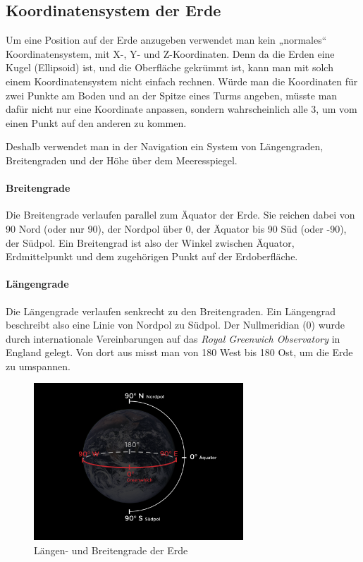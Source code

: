 \documentclass[12pt,a4paper]{scrartcl}
\begin{document}
\subsection{Koordinatensystem der Erde}
Um eine Position auf der Erde anzugeben verwendet man kein „normales“ Koordinatensystem, mit X-, Y- und Z-Koordinaten. Denn da die Erden eine Kugel (Ellipsoid) ist, und die Oberfläche gekrümmt ist, kann man mit solch einem Koordinatensystem nicht einfach rechnen. Würde man die Koordinaten für zwei Punkte am Boden und an der Spitze eines Turms angeben, müsste man dafür nicht nur eine Koordinate anpassen, sondern wahrscheinlich alle 3, um vom einen Punkt auf den anderen zu kommen.

Deshalb verwendet man in der Navigation ein System von Längengraden, Breitengraden und der Höhe über dem Meeresspiegel.

\paragraph{Breitengrade} Die Breitengrade verlaufen parallel zum Äquator der Erde. Sie reichen dabei von 90\degree{} Nord (oder nur 90\degree), der Nordpol über 0\degree, der Äquator bis 90\degree{} Süd (oder -90\degree), der Südpol. Ein Breitengrad ist also der Winkel zwischen Äquator, Erdmittelpunkt und dem zugehörigen Punkt auf der Erdoberfläche.

\paragraph{Längengrade}
Die Längengrade verlaufen senkrecht zu den Breitengraden. Ein Längengrad beschreibt also eine Linie von Nordpol zu Südpol. Der Nullmeridian (0\degree{}) wurde durch internationale Vereinbarungen auf das \emph{Royal Greenwich Observatory} in England gelegt. Von dort aus misst man von 180\degree{} West bis 180\degree{} Ost, um die Erde zu umspannen.

\begin{figure}
\centering
\includegraphics[width=0.7\textwidth]{img/latlong-01.png}
\caption{Längen- und Breitengrade der Erde}
\end{figure}
\end{document}
